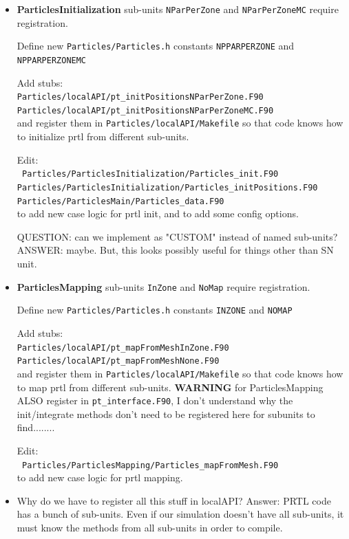 \documentclass[10pt]{article}
\begin{document}
\begin{itemize}
    \item \textbf{ParticlesInitialization} sub-units \texttt{NParPerZone} and
        \texttt{NParPerZoneMC} require registration.

        Define new \texttt{Particles/Particles.h} constants
        \texttt{NPPARPERZONE} and \texttt{NPPARPERZONEMC}

        Add stubs: \\
        \texttt{Particles/localAPI/pt\_initPositionsNParPerZone.F90 \\
                Particles/localAPI/pt\_initPositionsNParPerZoneMC.F90
        } \\
        and register them in \texttt{Particles/localAPI/Makefile} so that code
        knows how to initialize prtl from different sub-units.

        Edit: \\
        \texttt{
            Particles/ParticlesInitialization/Particles\_init.F90 \\
            Particles/ParticlesInitialization/Particles\_initPositions.F90 \\
            Particles/ParticlesMain/Particles\_data.F90 \\
        }
        to add new case logic for prtl init, and to add some config options.

        QUESTION: can we implement as "CUSTOM" instead of named sub-units?
        ANSWER: maybe.  But, this looks possibly useful for things other than
        SN unit.

    \item \textbf{ParticlesMapping} sub-units \texttt{InZone} and
        \texttt{NoMap} require registration.

        Define new \texttt{Particles/Particles.h} constants
        \texttt{INZONE} and \texttt{NOMAP}

        Add stubs: \\
        \texttt{Particles/localAPI/pt\_mapFromMeshInZone.F90 \\
                Particles/localAPI/pt\_mapFromMeshNone.F90
        } \\
        and register them in \texttt{Particles/localAPI/Makefile} so that code
        knows how to map prtl from different sub-units.
        \textbf{WARNING} for ParticlesMapping ALSO register in
        \texttt{pt\_interface.F90}, I don't understand why the init/integrate
        methods don't need to be registered here for subunits to find........

        Edit: \\
        \texttt{
            Particles/ParticlesMapping/Particles\_mapFromMesh.F90
        } \\
        to add new case logic for prtl mapping.

    \item Why do we have to register all this stuff in localAPI?
        Answer: PRTL code has a bunch of sub-units.
        Even if our simulation doesn't have all sub-units, it must know the
        methods from all sub-units in order to compile.

\end{itemize}
\end{document}
